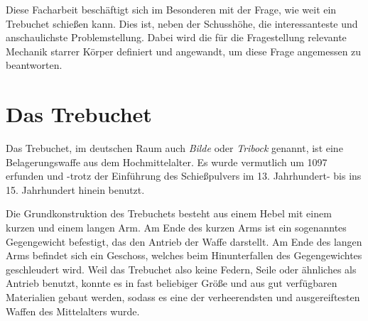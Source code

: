 Diese Facharbeit beschäftigt sich im Besonderen mit der Frage, wie weit ein Trebuchet schießen kann. Dies ist, neben der Schusshöhe, die interessanteste und anschaulichste Problemstellung. Dabei wird die für die Fragestellung relevante Mechanik starrer Körper definiert und angewandt, um diese Frage angemessen zu beantworten.

\section{Das Trebuchet}
Das Trebuchet, im deutschen Raum auch \emph{Bilde} oder \emph{Tribock} genannt, ist eine Belagerungswaffe aus dem Hochmittelalter. Es wurde vermutlich um 1097 erfunden und -trotz der Einführung des Schießpulvers im 13. Jahrhundert- bis ins 15. Jahrhundert hinein benutzt.

Die Grundkonstruktion des Trebuchets besteht aus einem Hebel mit einem kurzen und einem langen Arm. Am Ende des kurzen Arms ist ein sogenanntes Gegengewicht befestigt, das den Antrieb der Waffe darstellt. Am Ende des langen Arms befindet sich ein Geschoss, welches beim Hinunterfallen des Gegengewichtes geschleudert wird. Weil das Trebuchet also keine Federn, Seile oder ähnliches als Antrieb benutzt, konnte es in fast beliebiger Größe und aus gut verfügbaren Materialien gebaut werden, sodass es eine der verheerendsten und ausgereiftesten Waffen des Mittelalters wurde.